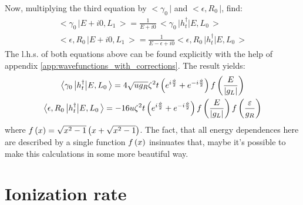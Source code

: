 Now, multiplying the third equation by $ \big<\gamma_{0}\,\big| $ and $ \big<\epsilon,R_{0}\,\big |$, find:
\begin{gather}
	\big<\gamma_{0}\,\big|E+i0,L_{1}\,\big>=\frac{1}{E+i0}\,\big<\gamma_{0}\,\big|h_{t}^{\dagger}\big|E,L_{0}\,\big>\\\big<\epsilon,R_{0}\,\big|E+i0,L_{1}\,\big>=\frac{1}{E-\epsilon+i0}\big<\epsilon,R_{0}\,\big|h_{t}^{\dagger}\big|E,L_{0}\,\big>
\end{gather}
The l.h.s. of both equations above can be found explicitly with the help of appendix \ref{app:wavefunctions_with_corrections}. The result yields:
\begin{gather}
	\big<\gamma_{0}\,\big|h_{t}^{\dagger}\big|E,L_{0}\,\big>
	=
	4\sqrt{ug_{R}}
	\zeta^{2}t
	\left(e^{i\frac{\phi}{2}}+e^{-i\frac{\phi}{2}}\right)
	f\left(\frac{E}{\left|g_L\right|}\right)
	\\
	\big<\epsilon,R_{0}\,\big|h_{t}^{\dagger}\big|E,L_{0}\,\big>
	=
	-16u\zeta^{2}t
	\left(e^{i\frac{\phi}{2}}+e^{-i\frac{\phi}{2}}\right)
	f\left(\frac{E}{\left|g_L\right|}\right)
	f\left(\frac{\varepsilon}{g_R}\right)
\end{gather}
where $ f\left(x\right)=\sqrt{x^2-1}\left(x+\sqrt{x^2-1}\right) $. The fact, that all energy dependences here are described by a single function $ f\left(x\right) $ insinuates that, maybe it's possible to make this calculations in some more beautiful way.

\section{Ionization rate}